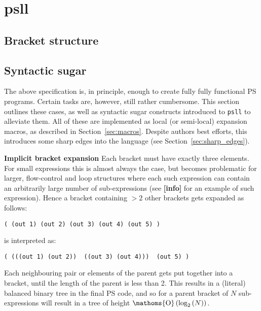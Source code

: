 \documentclass[aip,jcp,reprint,footinbib]{revtex4-1}
\DeclareMathOperator{\bigO}{\ensuremath{\mathoms{O}}}
\newcommand\plinfo{{\color[rgb]{0.929,0.694,0.125}\textbf{[info]}}\xspace}
\newcommand\psll{\texttt{psll}\xspace}
\begin{document}
\section{psll}


\subsection{Bracket structure}

\subsection{Syntactic sugar}\label{sec:sugar}
The above specification is, in principle, enough to create fully fully functional PS programs. Certain tasks are, however, still rather cumbersome. This section outlines these cases, as well as syntactic sugar constructs introduced to \psll to alleviate them. All of these are implemented as local (or semi-local) expansion macros, as described in Section~\ref{sec:macros}. Despite authors best efforts, this introduces some sharp edges into the language (see Section~\ref{sec:sharp_edges}).

\textbf{Implicit bracket expansion} Each bracket must have exactly three elements. For small expressions this is almost always the case, but becomes problematic for larger, flow-control and loop structures where each such expression can contain an arbitrarily large number of sub-expressions (see \plinfo for an example of such expression). Hence a bracket containing $>2$ other brackets gets expanded as follows:
\begin{lstlisting}[language=psll,aboveskip=3pt,belowskip=-2pt]
( (out 1) (out 2) (out 3) (out 4) (out 5) )
\end{lstlisting}
is interpreted as:
\begin{lstlisting}[language=psll,aboveskip=3pt,belowskip=-2pt]
( (((out 1) (out 2))  ((out 3) (out 4)))  (out 5) )
\end{lstlisting}
Each neighbouring pair or elements of the parent gets put together into a bracket, until the length of the parent is less than 2. This results in a (literal) balanced binary tree in the final PS code, and so for a parent bracket of $N$ sub-expressions will result in a tree of height $\bigO\left(\log_2\left(N\right)\right)$.
\end{document}
